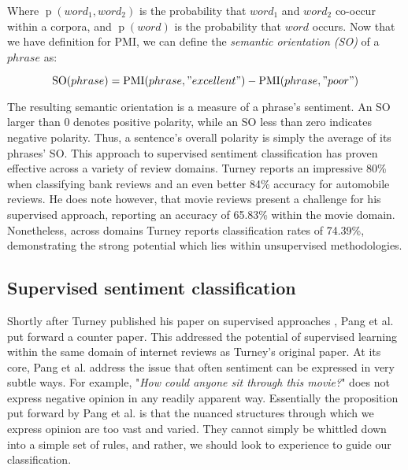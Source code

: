 Where $\operatorname{p}(word_1,word_2)$ is the probability that $word_1$ and $word_2$ co-occur within a corpora, and $\operatorname{p}(word)$ is the probability that $word$ occurs. Now that we have definition for PMI, we can define the \emph{semantic orientation (SO)} of a $phrase$ as:

\begin{equation}
	\operatorname{SO}(phrase) = \operatorname{PMI}(phrase, "excellent") - \operatorname{PMI}(phrase, "poor")
\end{equation}

The resulting semantic orientation is a measure of a phrase's sentiment. An SO larger than 0 denotes positive polarity, while an SO less than zero indicates negative polarity. Thus, a sentence's overall polarity is simply the average of its phrases' SO. This approach to supervised sentiment classification has proven effective across a variety of review domains. Turney reports an impressive 80\% when classifying bank reviews and an even better 84\% accuracy for automobile reviews. He does note however, that movie reviews present a challenge for his supervised approach, reporting an accuracy of 65.83\% within the movie domain. Nonetheless, across domains Turney reports classification rates of 74.39\%, demonstrating the strong potential which lies within unsupervised methodologies.

\subsection{Supervised sentiment classification}

Shortly after Turney published his paper on supervised approaches \cite{Turney:2002vv}, Pang et al. \cite{Pang:2002tu} put forward a counter paper. This addressed the potential of supervised learning within the same domain of internet reviews as Turney's original paper. At its core, Pang et al. address the issue that often sentiment can be expressed in very subtle ways. For example, "\emph{How could anyone sit through this movie?}" does not express negative opinion in any readily apparent way. Essentially the proposition put forward by Pang et al. is that the nuanced structures through which we express opinion are too vast and varied. They cannot simply be whittled down into a simple set of rules, and rather, we should look to experience to guide our classification.

